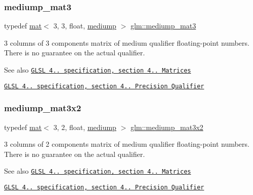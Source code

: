 \subsubsection{\texorpdfstring{mediump\+\_\+mat3}{mediump\_mat3}}
{\footnotesize\ttfamily typedef \mbox{\hyperlink{structglm_1_1mat}{mat}}$<$ 3, 3, float, \mbox{\hyperlink{namespaceglm_a36ed105b07c7746804d7fdc7cc90ff25a6416f3ea0c9025fb21ed50c4d6620482}{mediump}} $>$ \mbox{\hyperlink{group__core__precision_ga718616ee458f17e2525641b94975c184}{glm\+::mediump\+\_\+mat3}}}

3 columns of 3 components matrix of medium qualifier floating-\/point numbers. There is no guarantee on the actual qualifier.

\begin{DoxySeeAlso}{See also}
\href{http://www.opengl.org/registry/doc/GLSLangSpec.4.20.8.pdf}{\tt G\+L\+SL 4.. specification, section 4.. Matrices} 

\href{http://www.opengl.org/registry/doc/GLSLangSpec.4.20.8.pdf}{\tt G\+L\+SL 4.. specification, section 4.. Precision Qualifier} 
\end{DoxySeeAlso}
\mbox{\label{group__core__precision_ga1215c51719dd5e01efb27ff525e431fb}} 
\subsubsection{\texorpdfstring{mediump\+\_\+mat3x2}{mediump\_mat3x2}}
{\footnotesize\ttfamily typedef \mbox{\hyperlink{structglm_1_1mat}{mat}}$<$ 3, 2, float, \mbox{\hyperlink{namespaceglm_a36ed105b07c7746804d7fdc7cc90ff25a6416f3ea0c9025fb21ed50c4d6620482}{mediump}} $>$ \mbox{\hyperlink{group__core__precision_ga1215c51719dd5e01efb27ff525e431fb}{glm\+::mediump\+\_\+mat3x2}}}

3 columns of 2 components matrix of medium qualifier floating-\/point numbers. There is no guarantee on the actual qualifier.

\begin{DoxySeeAlso}{See also}
\href{http://www.opengl.org/registry/doc/GLSLangSpec.4.20.8.pdf}{\tt G\+L\+SL 4.. specification, section 4.. Matrices} 

\href{http://www.opengl.org/registry/doc/GLSLangSpec.4.20.8.pdf}{\tt G\+L\+SL 4.. specification, section 4.. Precision Qualifier} 
\end{DoxySeeAlso}
\mbox{\label{group__core__precision_ga774bbcb2f667fc0a91add50e55d8ac04}} 
